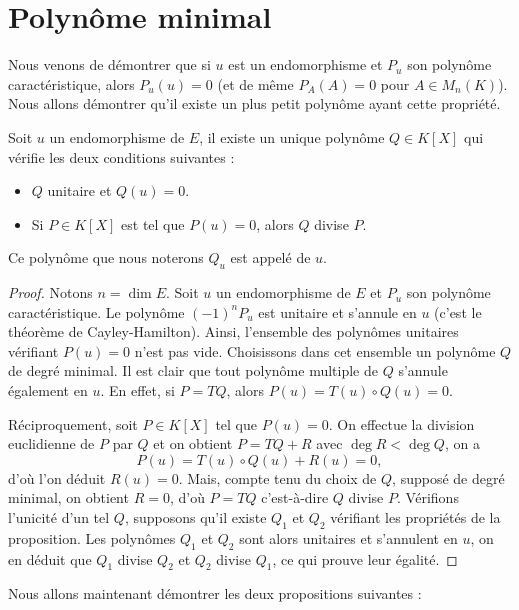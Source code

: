 \documentclass[class=report,crop=false]{standalone}
\begin{document}
\section{Polynôme minimal}

Nous venons de démontrer que si $u$ est un endomorphisme et $P_u$ son 
polynôme caractéristique, alors $P_u(u)=0$ (et de même $P_A(A)=0$ pour $A\in M_n(K)$). 
Nous allons démontrer qu'il existe un plus petit polynôme ayant cette propriété.

\begin{proposition}
Soit $u$ un endomorphisme de $E$, il existe un unique polynôme $Q\in K[X]$ 
qui vérifie les deux conditions suivantes :
\begin{itemize}
  \item $Q$ unitaire et $Q(u)=0$.
  \item Si $P\in K[X]$  est tel que $P(u)=0$, alors $Q$ divise $P$.
\end{itemize}
\end{proposition} 

Ce polynôme que nous noterons $Q_u$ est appelé  de $u$.

\begin{proof}
Notons $n=\dim E$. Soit $u$ un endomorphisme de $E$ et $P_u$ son polynôme caractéristique. Le polynôme $(-1)^nP_u$ est unitaire et s'annule en $u$ (c'est le théorème de Cayley-Hamilton).
Ainsi, l'ensemble des polynômes unitaires vérifiant $P(u)=0$ n'est pas vide. Choisissons dans cet ensemble un polynôme $Q$ de degré minimal. Il est clair que tout polynôme multiple de $Q$ s'annule également en $u$. En effet, si $P=TQ$, alors $P(u)=T(u)\circ Q(u)=0$.
 
Réciproquement, soit $P\in K[X]$ tel que $P(u)=0$. On effectue la division euclidienne de $P$ par $Q$ et on obtient $P=TQ+R$ avec $\deg R<\deg Q$, on a 
$$P(u)=T(u)\circ Q(u)+R(u)=0,$$
d'où l'on déduit $R(u)=0$. Mais, compte tenu du choix de $Q$, supposé de degré minimal, 
on obtient $R=0$, d'où $P=TQ$ c'est-à-dire $Q$ divise $P$. 
Vérifions l'unicité d'un tel $Q$, supposons qu'il existe $Q_1$ et $Q_2$ 
vérifiant les propriétés de la proposition. Les polynômes $Q_1$ et $Q_2$ 
sont alors unitaires et s'annulent en $u$, on en déduit que $Q_1$ divise 
$Q_2$ et $Q_2$ divise $Q_1$, ce qui prouve leur égalité. 
\end{proof}


Nous allons maintenant démontrer les deux propositions suivantes :
\end{document}
